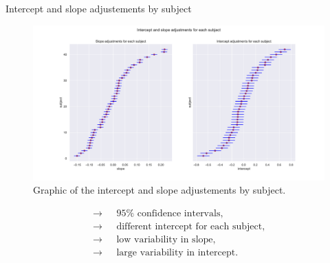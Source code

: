 \documentclass[unknownkeysallowed]{beamer}
\begin{document}
\begin{frame}{Intercept and slope adjustements by subject}
    \begin{figure}[H]
    \centering
    \includegraphics[scale=.24]{./images/model2_inter.pdf}
    \caption{Graphic of the intercept and slope adjustements by subject.}
    \end{figure}
\vspace{-0.3cm}
\begin{align*}
    \longrightarrow \text{ }& 95\% \text{ confidence intervals},\\
    \longrightarrow \text{ }& \text{different intercept for each subject},\\
    \longrightarrow \text{ }& \text{low variability in slope},\\
    \longrightarrow \text{ }& \text{large variability in intercept}.
\end{align*}
\end{frame}
\end{document}
